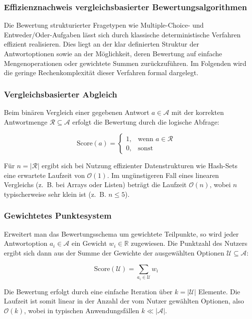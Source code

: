\documentclass[a4paper,12pt]{article}
\begin{document}
\subsubsection{Effizienznachweis vergleichsbasierter Bewertungsalgorithmen}

Die Bewertung strukturierter Fragetypen wie Multiple-Choice- und Entweder/Oder-Aufgaben lässt sich durch klassische deterministische Verfahren effizient realisieren. Dies liegt an der klar definierten Struktur der Antwortoptionen sowie an der Möglichkeit, deren Bewertung auf einfache Mengenoperationen oder gewichtete Summen zurückzuführen. Im Folgenden wird die geringe Rechenkomplexität dieser Verfahren formal dargelegt.

\subsubsection{Vergleichsbasierter Abgleich}

Beim binären Vergleich einer gegebenen Antwort \( a \in \mathcal{A} \) mit der korrekten Antwortmenge \( \mathcal{R} \subseteq \mathcal{A} \) erfolgt die Bewertung durch die logische Abfrage:

\[
\text{Score}(a) = 
\begin{cases}
1, & \text{wenn } a \in \mathcal{R} \\
0, & \text{sonst}
\end{cases}
\]

Für \( n = |\mathcal{R}| \) ergibt sich bei Nutzung effizienter Datenstrukturen wie Hash-Sets eine erwartete Laufzeit von \( \mathcal{O}(1) \). Im ungünstigeren Fall eines linearen Vergleichs (z.~B. bei Arrays oder Listen) beträgt die Laufzeit \( \mathcal{O}(n) \), wobei \( n \) typischerweise sehr klein ist (z.~B. \( n \leq 5 \)).

\subsubsection{Gewichtetes Punktesystem}

Erweitert man das Bewertungsschema um gewichtete Teilpunkte, so wird jeder Antwortoption \( a_i \in \mathcal{A} \) ein Gewicht \( w_i \in \mathbb{R} \) zugewiesen. Die Punktzahl des Nutzers ergibt sich dann aus der Summe der Gewichte der ausgewählten Optionen \( \mathcal{U} \subseteq \mathcal{A} \):

\[
\text{Score}(\mathcal{U}) = \sum_{a_i \in \mathcal{U}} w_i
\]

Die Bewertung erfolgt durch eine einfache Iteration über \( k = |\mathcal{U}| \) Elemente. Die Laufzeit ist somit linear in der Anzahl der vom Nutzer gewählten Optionen, also \( \mathcal{O}(k) \), wobei in typischen Anwendungsfällen \( k \ll |\mathcal{A}| \).
\end{document}
